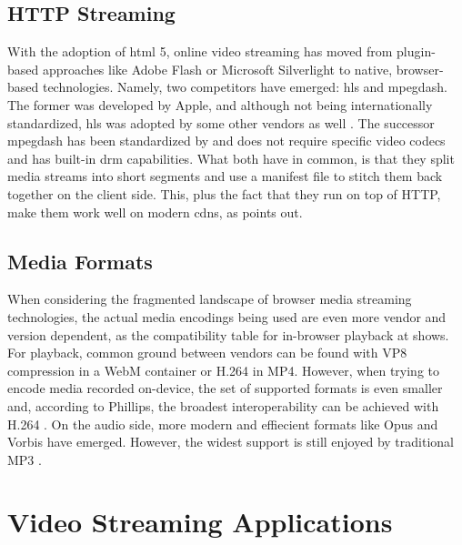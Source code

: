 \subsection{HTTP Streaming}
\label{subsec:http-streaming}

With the adoption of \gls{html} 5, online video streaming has moved from plugin-based approaches like Adobe Flash \cite{adobe-flash} or Microsoft Silverlight \cite{microsoft-silverlight} to native, browser-based technologies. Namely, two competitors have emerged: \gls{hls} and \gls{mpegdash}. The former was developed by Apple, and although not being internationally standardized, \gls{hls} was adopted by some other vendors as well \cite{caniuse-hls}. The successor \gls{mpegdash} has been standardized by \citet{iso-mpeg-dash} and does not require specific video codecs and has built-in \gls{drm} capabilities. What both have in common, is that they split media streams into short segments and use a manifest file to stitch them back together on the client side. This, plus the fact that they run on top of HTTP, make them work well on modern \glspl{cdn}, as \cite{hls-vs-dash} points out.

\subsection{Media Formats}

When considering the fragmented landscape of browser media streaming technologies, the actual media encodings being used are even more vendor and version dependent, as the compatibility table for in-browser playback at \cite{media-format-browser-compat} shows. For playback, common ground between vendors can be found with VP8 compression in a WebM container or H.264 in MP4. However, when trying to encode media recorded on-device, the set of supported formats is even smaller and, according to Phillips, the broadest interoperability can be achieved with H.264 \cite[\S5.1]{webrtc-hacks-safari}. On the audio side, more modern and effiecient formats like Opus and Vorbis have emerged. However, the widest support is still enjoyed by traditional MP3 \cite{media-format-browser-compat}.

\newpage

\section{Video Streaming Applications}

